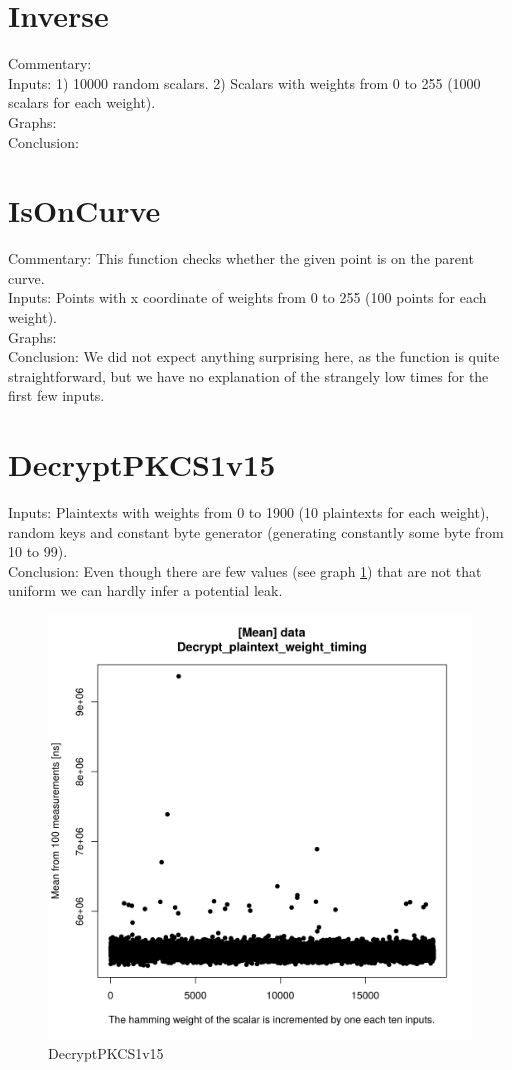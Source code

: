 \documentclass[a4paper]{scrartcl}
\begin{document}
\section{Inverse}
Commentary:
\\Inputs: 1) 10000 random scalars. 2) Scalars with weights from 0 to 255 (1000 scalars for each weight).
\\Graphs:
\\Conclusion:

\section{IsOnCurve}
Commentary: This function checks whether the given point is on the parent curve.
\\Inputs: Points with x coordinate of weights from 0 to 255 (100 points for each weight).
\\Graphs:
\\Conclusion: We did not expect anything surprising here, as the function is quite straightforward, but we have no explanation of the strangely low times for the first few inputs.
\fi

\section{DecryptPKCS1v15}
Inputs: Plaintexts with weights from 0 to 1900 (10 plaintexts for each weight), random keys and constant byte generator (generating constantly some byte from 10 to 99).
\\Conclusion: Even though there are  few values (see graph \ref{fig:DecryptPKCS1v15}) that are not that uniform we can hardly infer a potential leak.

\begin{figure}
    \centering
  \includegraphics[width=0.4\linewidth]{data_Decrypt_plaintext_weight_timing-means.png}
  \caption{DecryptPKCS1v15}
  \label{fig:DecryptPKCS1v15}
\end{figure}
\end{document}
